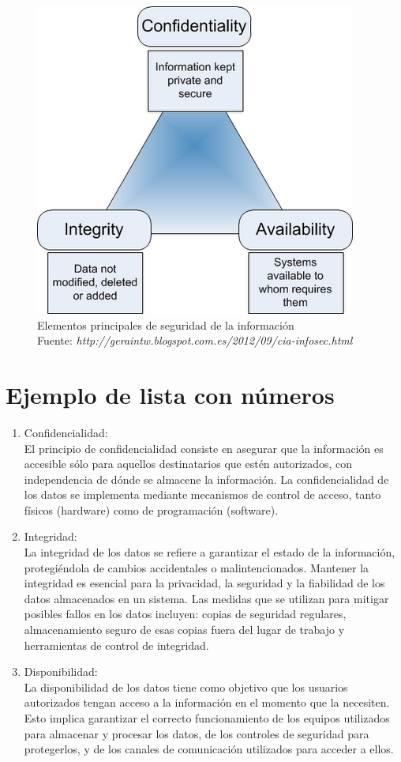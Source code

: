 \documentclass[12pt,a4paper,onecolumn,oneside]{report}
\begin{document}
\begin{figure}[htb] 
\centering
  \includegraphics[width=.55\textwidth]{figuras/c-i-a.png}
  \caption[Elementos principales de seguridad de la información]{Elementos principales de seguridad de la información\\
  \footnotesize{Fuente: \textit{http://geraintw.blogspot.com.es/2012/09/cia-infosec.html}}}
  \label{fig:fundamentos-seguridad}
\end{figure}


\section*{Ejemplo de lista con números}

\begin{enumerate}

\item Confidencialidad:\\
El principio de confidencialidad consiste en asegurar que la información es accesible sólo para aquellos destinatarios que estén autorizados, con independencia de dónde se almacene la información.
La confidencialidad de los datos se implementa mediante mecanismos de control de acceso, tanto físicos (hardware) como  de programación (software).

\item Integridad:\\
La integridad de los datos se refiere a garantizar el estado de la información, protegiéndola de cambios accidentales o malintencionados. Mantener la integridad es esencial para la privacidad, la seguridad y la fiabilidad de los datos almacenados en un sistema.
Las medidas que se utilizan para mitigar posibles fallos en los datos incluyen: copias de seguridad regulares, almacenamiento seguro de esas copias fuera del lugar de trabajo y herramientas de control de integridad.

\item Disponibilidad:\\
La disponibilidad de los datos tiene como objetivo que los usuarios autorizados tengan acceso a la información en el momento que la necesiten. Esto implica garantizar el correcto funcionamiento de los equipos utilizados para almacenar y procesar los datos, de los controles de seguridad para protegerlos, y de los canales de comunicación utilizados para acceder a ellos.

\end{enumerate}
\end{document}
